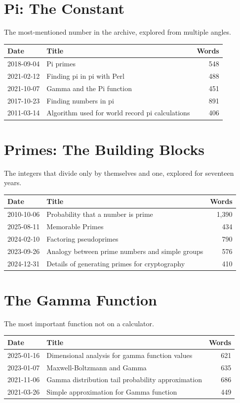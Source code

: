 \bigskip

\section*{Pi: The Constant}

The most-mentioned number in the archive, explored from multiple angles.

\begin{longtable}{l p{5.5cm} r}
\toprule
\textbf{Date} & \textbf{Title} & \textbf{Words} \tabularnewline
\midrule
2018-09-04 & Pi primes & 548 \tabularnewline
2021-02-12 & Finding pi in pi with Perl & 488 \tabularnewline
2021-10-07 & Gamma and the Pi function & 451 \tabularnewline
2017-10-23 & Finding numbers in pi & 891 \tabularnewline
2011-03-14 & Algorithm used for world record pi calculations & 406 \tabularnewline
\bottomrule
\end{longtable}

\bigskip

\section*{Primes: The Building Blocks}

The integers that divide only by themselves and one, explored for seventeen years.

\begin{longtable}{l p{5.5cm} r}
\toprule
\textbf{Date} & \textbf{Title} & \textbf{Words} \tabularnewline
\midrule
2010-10-06 & Probability that a number is prime & 1,390 \tabularnewline
2025-08-11 & Memorable Primes & 434 \tabularnewline
2024-02-10 & Factoring pseudoprimes & 790 \tabularnewline
2023-09-26 & Analogy between prime numbers and simple groups & 576 \tabularnewline
2024-12-31 & Details of generating primes for cryptography & 410 \tabularnewline
\bottomrule
\end{longtable}

\bigskip

\section*{The Gamma Function}

The most important function not on a calculator.

\begin{longtable}{l p{5.5cm} r}
\toprule
\textbf{Date} & \textbf{Title} & \textbf{Words} \tabularnewline
\midrule
2025-01-16 & Dimensional analysis for gamma function values & 621 \tabularnewline
2023-01-07 & Maxwell-Boltzmann and Gamma & 635 \tabularnewline
2021-11-06 & Gamma distribution tail probability approximation & 686 \tabularnewline
2021-03-26 & Simple approximation for Gamma function & 449 \tabularnewline
\bottomrule
\end{longtable}

